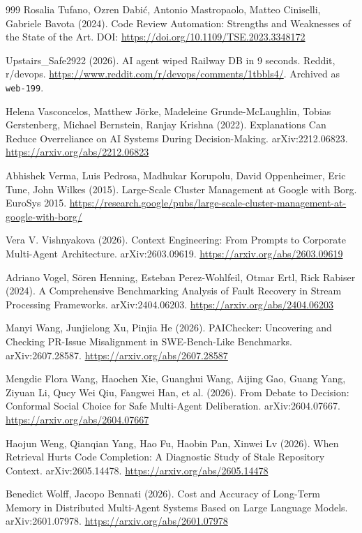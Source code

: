\begin{thebibliography}{999}
 Rosalia Tufano, Ozren Dabi\'{c}, Antonio Mastropaolo, Matteo Ciniselli, Gabriele Bavota (2024). Code Review Automation: Strengths and Weaknesses of the State of the Art. DOI: \url{https://doi.org/10.1109/TSE.2023.3348172}

 Upstairs\_Safe2922 (2026). AI agent wiped Railway DB in 9 seconds. Reddit, r/devops. \url{https://www.reddit.com/r/devops/comments/1tbbls4/}. Archived as \texttt{web-199}.

 Helena Vasconcelos, Matthew J\"{o}rke, Madeleine Grunde-McLaughlin, Tobias Gerstenberg, Michael Bernstein, Ranjay Krishna (2022). Explanations Can Reduce Overreliance on AI Systems During Decision-Making. arXiv:2212.06823. \url{https://arxiv.org/abs/2212.06823}

 Abhishek Verma, Luis Pedrosa, Madhukar Korupolu, David Oppenheimer, Eric Tune, John Wilkes (2015). Large-Scale Cluster Management at Google with Borg. EuroSys 2015. \url{https://research.google/pubs/large-scale-cluster-management-at-google-with-borg/}

 Vera V. Vishnyakova (2026). Context Engineering: From Prompts to Corporate Multi-Agent Architecture. arXiv:2603.09619. \url{https://arxiv.org/abs/2603.09619}

 Adriano Vogel, S\"{o}ren Henning, Esteban Perez-Wohlfeil, Otmar Ertl, Rick Rabiser (2024). A Comprehensive Benchmarking Analysis of Fault Recovery in Stream Processing Frameworks. arXiv:2404.06203. \url{https://arxiv.org/abs/2404.06203}

 Manyi Wang, Junjielong Xu, Pinjia He (2026). PAIChecker: Uncovering and Checking PR-Issue Misalignment in SWE-Bench-Like Benchmarks. arXiv:2607.28587. \url{https://arxiv.org/abs/2607.28587}

 Mengdie Flora Wang, Haochen Xie, Guanghui Wang, Aijing Gao, Guang Yang, Ziyuan Li, Qucy Wei Qiu, Fangwei Han, et al. (2026). From Debate to Decision: Conformal Social Choice for Safe Multi-Agent Deliberation. arXiv:2604.07667. \url{https://arxiv.org/abs/2604.07667}

 Haojun Weng, Qianqian Yang, Hao Fu, Haobin Pan, Xinwei Lv (2026). When Retrieval Hurts Code Completion: A Diagnostic Study of Stale Repository Context. arXiv:2605.14478. \url{https://arxiv.org/abs/2605.14478}

 Benedict Wolff, Jacopo Bennati (2026). Cost and Accuracy of Long-Term Memory in Distributed Multi-Agent Systems Based on Large Language Models. arXiv:2601.07978. \url{https://arxiv.org/abs/2601.07978}


\end{thebibliography}
